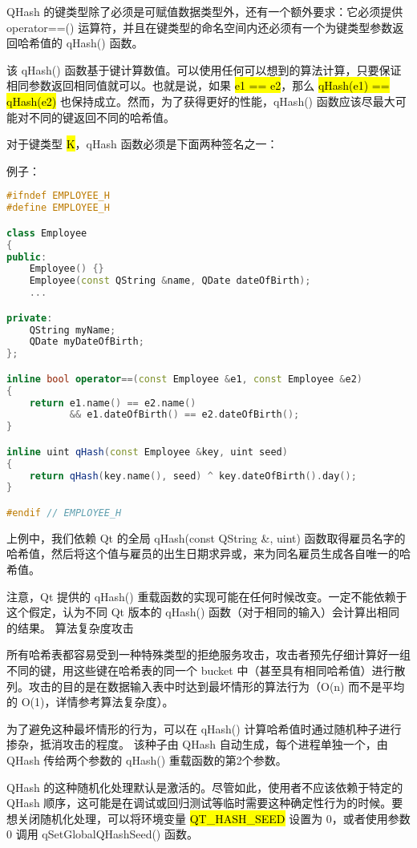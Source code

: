 QHash 的键类型除了必须是可赋值数据类型外，还有一个额外要求：它必须提供 operator==() 运算符，并且在键类型的命名空间内还必须有一个为键类型参数返回哈希值的 qHash() 函数。

该 qHash() 函数基于键计算数值。可以使用任何可以想到的算法计算，只要保证相同参数返回相同值就可以。也就是说，如果 \hl{e1 == e2}，那么 \hl{qHash(e1) == qHash(e2)} 也保持成立。然而，为了获得更好的性能，qHash() 函数应该尽最大可能对不同的键返回不同的哈希值。

对于键类型 \hl{K}，qHash 函数必须是下面两种签名之一：


例子：

\begin{lstlisting}[language=C++]
#ifndef EMPLOYEE_H
#define EMPLOYEE_H

class Employee
{
public:
    Employee() {}
    Employee(const QString &name, QDate dateOfBirth);
    ...

private:
    QString myName;
    QDate myDateOfBirth;
};

inline bool operator==(const Employee &e1, const Employee &e2)
{
    return e1.name() == e2.name()
           && e1.dateOfBirth() == e2.dateOfBirth();
}

inline uint qHash(const Employee &key, uint seed)
{
    return qHash(key.name(), seed) ^ key.dateOfBirth().day();
}

#endif // EMPLOYEE_H
\end{lstlisting}

上例中，我们依赖 Qt 的全局 qHash(const QString \&, uint) 函数取得雇员名字的哈希值，然后将这个值与雇员的出生日期求异或，来为同名雇员生成各自唯一的哈希值。

注意，Qt 提供的 qHash() 重载函数的实现可能在任何时候改变。一定不能依赖于这个假定，认为不同 Qt 版本的 qHash() 函数（对于相同的输入）会计算出相同的结果。
算法复杂度攻击

所有哈希表都容易受到一种特殊类型的拒绝服务攻击，攻击者预先仔细计算好一组不同的键，用这些键在哈希表的同一个 bucket 中（甚至具有相同哈希值）进行散列。攻击的目的是在数据输入表中时达到最坏情形的算法行为（O(n) 而不是平均的 O(1)，详情参考算法复杂度）。

为了避免这种最坏情形的行为，可以在 qHash() 计算哈希值时通过随机种子进行掺杂，抵消攻击的程度。 该种子由 QHash 自动生成，每个进程单独一个，由 QHash 传给两个参数的 qHash() 重载函数的第2个参数。

QHash 的这种随机化处理默认是激活的。尽管如此，使用者不应该依赖于特定的 QHash 顺序，这可能是在调试或回归测试等临时需要这种确定性行为的时候。要想关闭随机化处理，可以将环境变量 \hl{QT\_HASH\_SEED} 设置为 0，或者使用参数 0 调用 qSetGlobalQHashSeed() 函数。

